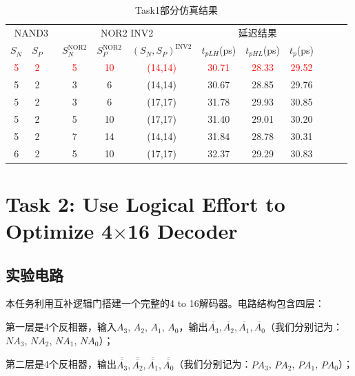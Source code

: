 \documentclass[UTF8,12pt,a4paper]{ctexart}
\begin{document}
\begin{table}[htbp]
    \centering
    \caption{Task1部分仿真结果}
    \label{tab:task1_results}
    \small
    \begin{tabular}{cccccc|cccccc}
        \toprule
        \multicolumn{3}{c}{NAND3} & \multicolumn{3}{c|}{NOR2 \qquad INV2} & \multicolumn{3}{c}{延迟结果} \\
        $S_N$ & $S_P$ & & $S_N^{\text{NOR2}}$ & $S_P^{\text{NOR2}}$ & $(S_N, S_P)^{\text{INV2}}$ & $t_{pLH}$(ps) & $t_{pHL}$(ps) & $t_p$(ps) \\
        \midrule
        \textcolor{red}{5} & \textcolor{red}{2} & & \textcolor{red}{5} & \textcolor{red}{10} & \textcolor{red}{(14,14)} & \textcolor{red}{30.71} & \textcolor{red}{28.33} & \textcolor{red}{29.52} \\
        5 & 2 & & 3 & 6 & (14,14) & 30.67 & 28.85 & 29.76 \\
        5 & 2 & & 3 & 6 & (17,17) & 31.78 & 29.93 & 30.85 \\
        5 & 2 & & 5 & 10 & (17,17) & 31.40 & 29.01 & 30.20 \\
        5 & 2 & & 7 & 14 & (14,14) & 31.84 & 28.78 & 30.31 \\
        6 & 2 & & 5 & 10 & (17,17) & 32.37 & 29.29 & 30.83 \\
        \bottomrule
    \end{tabular}
\end{table}


\newpage
\section{Task 2: Use Logical Effort to Optimize 4$\times$16 Decoder}

\subsection{实验电路}

本任务利用互补逻辑门搭建一个完整的4 to 16解码器。电路结构包含四层：

第一层是4个反相器，输入$A_3$, $A_2$, $A_1$, $A_0$，输出$\overline{A_3}, \overline{A_2}, \overline{A_1}, \overline{A_0}$（我们分别记为：$NA_3$, $NA_2$, $NA_1$, $NA_0$）；

第二层是4个反相器，输出$\overline{\overline{A_3}}, \overline{\overline{A_2}}, \overline{\overline{A_1}}, \overline{\overline{A_0}}$（我们分别记为：$PA_3$, $PA_2$, $PA_1$, $PA_0$）；
\end{document}
